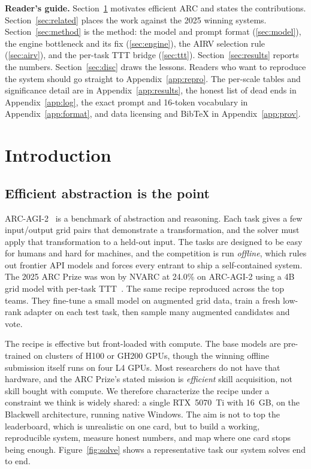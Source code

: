 \documentclass[11pt]{article}
\begin{document}
{\small\tableofcontents}
\medskip

\noindent\textbf{Reader's guide.} Section~\ref{sec:intro} motivates efficient ARC and states the
contributions. Section~\ref{sec:related} places the work against the 2025 winning systems.
Section~\ref{sec:method} is the method: the model and prompt format (\ref{sec:model}), the engine
bottleneck and its fix (\ref{sec:engine}), the AIRV selection rule (\ref{sec:airv}), and the per-task
TTT bridge (\ref{sec:ttt}). Section~\ref{sec:results} reports the numbers. Section~\ref{sec:disc}
draws the lessons. Readers who want to reproduce the system should go straight to
Appendix~\ref{app:repro}. The per-scale tables and significance detail are in
Appendix~\ref{app:results}, the honest list of dead ends in Appendix~\ref{app:log}, the exact prompt
and 16-token vocabulary in Appendix~\ref{app:format}, and data licensing and BibTeX in
Appendix~\ref{app:prov}.

\section{Introduction}
\label{sec:intro}

\subsection{Efficient abstraction is the point}
ARC-AGI-2~\cite{chollet,arcagi2} is a benchmark of abstraction and reasoning. Each task gives a few
input/output grid pairs that demonstrate a transformation, and the solver must apply that
transformation to a held-out input. The tasks are designed to be easy for humans and hard for
machines, and the competition is run \emph{offline}, which rules out frontier API models and forces
every entrant to ship a self-contained system. The 2025 ARC Prize was won by NVARC at 24.0\% on
ARC-AGI-2 using a 4B grid model with per-task TTT~\cite{arc2025,nvarc}. The same recipe reproduced
across the top teams. They fine-tune a small model on augmented grid data, train a fresh low-rank
adapter on each test task, then sample many augmented candidates and vote.

The recipe is effective but front-loaded with compute. The base models are pre-trained on clusters of
H100 or GH200 GPUs, though the winning offline submission itself runs on four L4 GPUs. Most researchers do not have that hardware, and the ARC Prize's stated mission is
\emph{efficient} skill acquisition, not skill bought with compute. We therefore characterize the
recipe under a constraint we think is widely shared: a single RTX~5070~Ti with 16~GB, on the
Blackwell architecture, running native Windows. The aim is not to top the leaderboard, which is
unrealistic on one card, but to build a working, reproducible system, measure honest numbers, and map
where one card stops being enough. Figure~\ref{fig:solve} shows a representative task our system
solves end to end.
\end{document}
